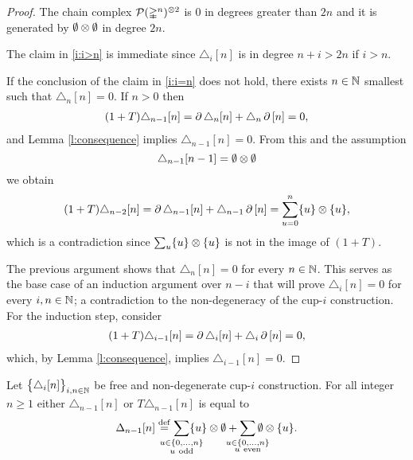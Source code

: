 \begin{proof}
	The chain complex $\mathcal{P}(\mathbb{\Delta}^n)^{\otimes 2}$ is $0$ in degrees greater than $2n$ and it is generated by $\emptyset \otimes \emptyset$ in degree $2n$.

	The claim in \cref{i:i>n} is immediate since $\triangle_i[n]$ is in degree $n+i > 2n$ if $i > n$.

	If the conclusion of the claim in \cref{i:i=n} does not hold, there exists $n \in \mathbb{N}$ smallest such that $\triangle_n [n] = 0$.
	If $n > 0$ then
	\begin{align*}
	(1+T) \triangle_{n-1} [n] =
	\operatorname{\partial} \triangle_{n} [n] + \triangle_{n} \operatorname{\partial} \, [n] = 0,
	\end{align*}
	and Lemma \ref{l:consequence} implies $\triangle_{n-1} [n] = 0$.
	From this and the assumption
	\[
	\triangle_{n-1}[n-1] = \emptyset \otimes \emptyset
	\]
	we obtain
	\begin{equation}
	\begin{split}
	(1+T)\triangle_{n-2} [n] =
	\operatorname{\partial} \triangle_{n-1} [n] + \triangle_{n-1} \operatorname{\partial} \, [n] =
	\sum_{u = 0}^n \{u\} \otimes \{u\},
	\end{split}
	\end{equation}
	which is a contradiction since $\sum_u \{u\} \otimes \{u\}$ is not in the image of $(1+T)$.

	The previous argument shows that $\triangle_n [n] = 0$ for every $n \in \mathbb{N}$.
	This serves as the base case of an induction argument over $n-i$ that will prove $\triangle_i [n] = 0$ for every $i, n \in \mathbb{N}$; a contradiction to the non-degeneracy of the cup-$i$ construction.
	For the induction step, consider
	\begin{align*}
	(1+T) \triangle_{i-1} [n] =
	\operatorname{\partial} \triangle_{i} [n] + \triangle_{i} \operatorname{\partial}\, [n] = 0,
	\end{align*}
	which, by Lemma \ref{l:consequence}, implies $\triangle_{i-1} [n] = 0$.
\end{proof}

\begin{lemma} \label{l:special case two}
	Let $\big\{ \triangle_i [n] \big\}_{i,n\in\mathbb{N}}$ be free and non-degenerate \mbox{cup-$i$} construction.
	For all integer $n \geq 1$ either $\triangle_{n-1} [n]$ or $T \triangle_{n-1} [n]$ is equal to
	\[
	\Delta_{n-1} [n] \defeq
	\sum_{\mathclap{\substack{u \in \{0,\dots,n\} \\ u \ \mathrm{odd}}}} \{u\} \ot \emptyset +
	\sum_{\mathclap{\substack{u \in \{0,\dots,n\} \\ u \ \mathrm{even}}}} \emptyset \ot \{u\}.
	\]
\end{lemma}

